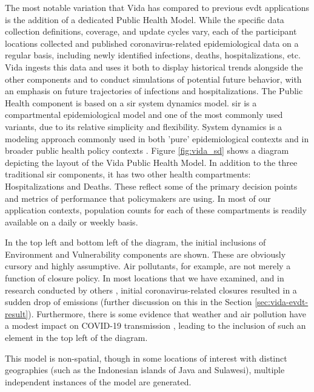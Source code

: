 The most notable variation that Vida has compared to previous \ac{evdt} applications is the addition of a dedicated Public Health Model. While the specific data collection definitions, coverage, and update cycles vary, each of the participant locations collected and published coronavirus-related epidemiological data on a regular basis, including newly identified infections, deaths, hospitalizations, etc. Vida ingests this data and uses it both to display historical trends alongside the other components and to conduct simulations of potential future behavior, with an emphasis on future trajectories of infections and hospitalizations. The Public Health component is based on a \ac{sir} system dynamics model. \ac{sir} is a compartmental epidemiological model and one of the most commonly used variants, due to its relative simplicity and flexibility. System dynamics is a modeling approach commonly used in both 'pure' epidemiological contexts \cite{homerSystemDynamicsModeling2006} and in broader public health policy contexts \cite{deutschCommunitybasedSystemDynamics2020}. Figure \ref{fig:vida_sd} shows a diagram depicting the layout of the Vida Public Health Model. In addition to the three traditional \ac{sir} components, it has two other health compartments: Hospitalizations and Deaths. These reflect some of the primary decision points and metrics of performance that policymakers are using. In most of our application contexts, population counts for each of these compartments is readily available on a daily or weekly basis. 

In the top left and bottom left of the diagram, the initial inclusions of Environment and Vulnerability components are shown. These are obviously cursory and highly assumptive. Air pollutants, for example, are not merely a function of closure policy. In most locations that we have examined, and in research conducted by others \cite{isaifanDramaticImpactCoronavirus2020}, initial coronavirus-related closures resulted in a sudden drop of emissions (further discussion on this in the Section \ref{sec:vida-evdt-result}). Furthermore, there is some evidence that weather and air pollution have a modest impact on COVID-19 transmission \cite{xuModestImpactWeather2020}, leading to the inclusion of such an element in the top left of the diagram.

This model is non-spatial, though in some locations of interest with distinct geographies (such as the Indonesian islands of Java and Sulawesi), multiple independent instances of the model are generated.

